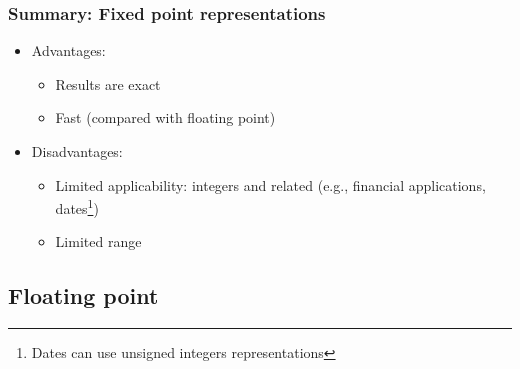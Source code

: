 \documentclass[11pt,a4paper]{article}
\begin{document}
\begin{frame}[fragile]
	\frametitle{Summary: Fixed point representations}

	 \begin{itemize}
	    \item Advantages:
	    \begin{itemize}
	        \item Results are exact
	        \item Fast (compared with floating point)
	    \end{itemize}
	    \item <2-> Disadvantages:
	    \begin{itemize}
	        \item Limited applicability: integers and related (e.g., financial applications, dates\footnote{Dates can use unsigned integers representations})
	        \item Limited range
	    \end{itemize}
	\end{itemize}

\end{frame}

\subsection{Floating point}
\end{document}
